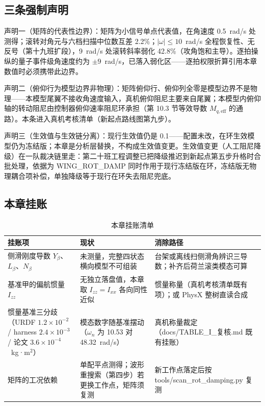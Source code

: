 \documentclass[11pt,a4paper]{ctexart}
\begin{document}
\subsection{三条强制声明}

声明一（矩阵的代表性边界）：矩阵为小信号单点代表值，在角速度 0.5~rad/s 处测得；滚转对角元与六档扫描中位数互差 2.2\%；$|\omega|\le 10$~rad/s 全程恢复性、无反号（第十九班扩段），9~rad/s 处滚转斜率弱化 42.8\%（攻角饱和主导）。逐拍操纵的量子事件级角速度约为 $\pm9$~rad/s，已落入弱化区——逐拍权限折算引用本章数值时必须携带此边界。

声明二（俯仰行为模型边界非物理）：矩阵俯仰行、俯仰列全零是模型边界不是物理——本模型尾翼不接收角速度输入，真机俯仰阻尼主要来自尾翼；本模型内俯仰轴的转动阻尼由控制器俯仰速率阻尼环承担（第 10.3 节等效导数 $M_{q,\mathrm{eff}}$ 的通路）。本条进入真机考核清单（新起点路线图第九步）。

声明三（生效值与生效链分离）：现行生效值仍是 0.1——配置未改，在环生效模型仍为冻结版；本章是分析层替换，不构成生效值变更。生效值变更（人工阻尼降级）在一队裁决链里走：第二十班工程调整已把降级推迟到新起点第五步升格时合批处理，依据为 WING\_ROT\_DAMP 同时作用于现行冻结版在环，冻结版无物理耦合项补偿，单独降级等于现行在环失去阻尼兜底。

\subsection{本章挂账}\label{sec:lateral-budget}

\begin{table}[htbp]
\centering\small
\begin{tabularx}{\textwidth}{>{\raggedright\arraybackslash}p{}XX}
\toprule
挂账项 & 现状 & 消除路径 \\
\midrule
侧滑刚度导数 $Y_\beta$、$L_\beta$、$N_\beta$ & 未测量，完整四状态横向模型不可组装 & 台架或离线扫侧滑角辨识三导数；补齐后荷兰滚类模态可算 \\
基准甲的偏航惯量 $I_{zz}$ & 无独立落盘值，本章取 $I_{zz}=I_{xx}$ 各向同性近似 & 惯量称量（真机考核清单既有项）；或 PhysX 整树直读合成 \\
惯量基准三分歧（URDF $1.2\times10^{-2}$ / harness $2.4\times10^{-3}$ / 论文 $3.6\times10^{-4}$~kg·m$^2$） & 模态数字随基准摆动（$\omega_n$ 为 10.53 对 48.32~rad/s） & 真机称量裁定（docs/TABLE\_I\_复核.md 既有挂账） \\
矩阵的工况依赖 & 单配平点测得；波形重搜索（第四步）若更换工作点，矩阵须复测 & 新工作点落定后按 tools/scan\_rot\_damping.py 复测 \\
\bottomrule
\end{tabularx}
\caption{本章挂账清单}
\end{table}
\end{document}
